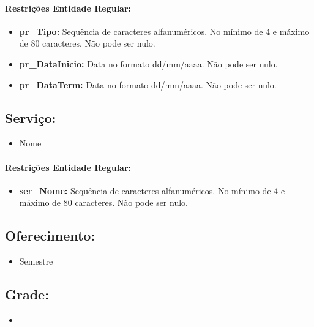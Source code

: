 \documentclass{report}
\begin{document}
\paragraph{Restrições Entidade Regular:}
\begin{itemize}
  \item \textbf{pr\_Tipo:} Sequência de caracteres alfanuméricos. No mínimo de 4 e máximo de 80 caracteres. Não pode ser nulo.
  \item \textbf{pr\_DataInicio:} Data no formato dd/mm/aaaa. Não pode ser nulo.
  \item \textbf{pr\_DataTerm:} Data no formato dd/mm/aaaa. Não pode ser nulo.
\end{itemize}

\subsection{Serviço:}
\begin{itemize}
  \item Nome
\end{itemize}
\paragraph{Restrições Entidade Regular:}
\begin{itemize}
  \item \textbf{ser\_Nome:} Sequência de caracteres alfanuméricos. No mínimo de 4 e máximo de 80 caracteres. Não pode ser nulo.
\end{itemize}

\subsection{Oferecimento:}
\begin{itemize}
  \item Semestre
\end{itemize}

\subsection{Grade:}
\begin{itemize}
  \item
\end{itemize}
\end{document}
